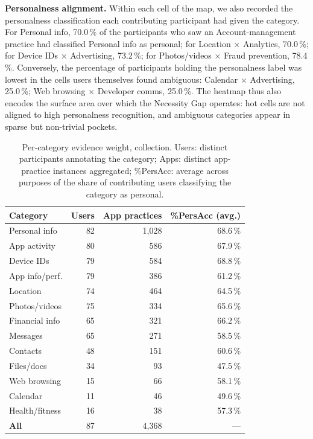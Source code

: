 \documentclass[11pt,a4paper]{article}
\begin{document}
\textbf{Personalness alignment.} Within each cell of the map, we also
recorded the personalness classification each contributing participant
had given the category. For Personal info, 70.0\,\% of the
participants who saw an Account-management practice had classified
Personal info as personal; for Location $\times$ Analytics, 70.0\,\%;
for Device IDs $\times$ Advertising, 73.2\,\%; for Photos/videos
$\times$ Fraud prevention, 78.4\,\%. Conversely, the percentage of
participants holding the personalness label was lowest in the cells
users themselves found ambiguous: Calendar $\times$ Advertising,
25.0\,\%; Web browsing $\times$ Developer comms, 25.0\,\%. The
heatmap thus also encodes the surface area over which the Necessity
Gap operates: hot cells are not aligned to high personalness
recognition, and ambiguous categories appear in sparse but
non-trivial pockets.

\begin{table}[t]
\centering
\caption{Per-category evidence weight, collection. Users: distinct
participants annotating the category; Apps: distinct app-practice
instances aggregated; \%PersAcc: average across purposes of the share
of contributing users classifying the category as personal.}
\label{tab:cat-evidence-coll}
\small
\begin{tabular}{lrrr}
\toprule
\textbf{Category} & \textbf{Users} & \textbf{App practices}
                  & \textbf{\%PersAcc (avg.)} \\
\midrule
Personal info     & 82 & 1{,}028 & 68.6\,\% \\
App activity      & 80 &    586  & 67.9\,\% \\
Device IDs        & 79 &    584  & 68.8\,\% \\
App info/perf.    & 79 &    386  & 61.2\,\% \\
Location          & 74 &    464  & 64.5\,\% \\
Photos/videos     & 75 &    334  & 65.6\,\% \\
Financial info    & 65 &    321  & 66.2\,\% \\
Messages          & 65 &    271  & 58.5\,\% \\
Contacts          & 48 &    151  & 60.6\,\% \\
Files/docs        & 34 &     93  & 47.5\,\% \\
Web browsing      & 15 &     66  & 58.1\,\% \\
Calendar          & 11 &     46  & 49.6\,\% \\
Health/fitness    & 16 &     38  & 57.3\,\% \\
\midrule
\textbf{All}      & 87 & 4{,}368 & --- \\
\bottomrule
\end{tabular}
\end{table}
\end{document}
